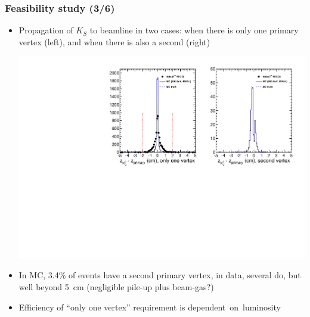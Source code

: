 \documentclass[compress]{beamer}
\begin{document}
\begin{frame}
\frametitle{Feasibility study (3/6)}

\begin{itemize}
\item Propagation of $K_S$ to beamline in two cases: when there is only one primary vertex (left), and when there is also a second (right)

\includegraphics[width=\linewidth]{kaonTracking_zcut.pdf}

\item In MC, 3.4\% of events have a second primary vertex, in data, several do, but well beyond 5~cm (negligible pile-up plus beam-gas?)

\item Efficiency of ``only one vertex'' requirement is \mbox{dependent on luminosity\hspace{-1 cm}}
\end{itemize}
\end{frame}
\end{document}
